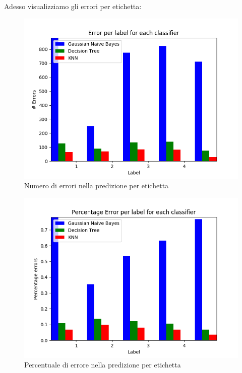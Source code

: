 Adesso visualizziamo gli errori per etichetta:

\begin{figure}[H]
	\centering
	\includegraphics[width=0.7\linewidth]{img/test_error_per_label}
	\caption{Numero di errori nella predizione per etichetta}
	\label{fig:testerrorperlabel}
\end{figure}
\medskip
\begin{figure}[H]
	\centering
	\includegraphics[width=0.7\linewidth]{img/percentage_test_errors_per_label}
	\caption{Percentuale di errore nella predizione per etichetta}
	\label{fig:percentagetesterrorsperlabel}
\end{figure}

